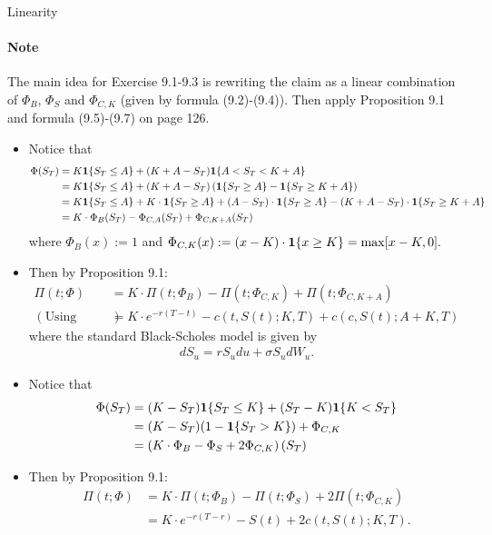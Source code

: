 \begin{prop}
	Linearity
\end{prop}
 \paragraph{Note} The main idea for Exercise 9.1-9.3 is rewriting the claim as a linear combination of $\Phi_B$, $\Phi_S$ and $\Phi_{C,K}$ (given by formula (9.2)-(9.4)). Then apply Proposition 9.1 and formula (9.5)-(9.7) on page 126. 
\begin{example}

	\begin{itemize}
		\item Notice that 
		\begin{align*}
		\Phi( S_T ) &= K \boldsymbol{1} \{  S_T \leq A \} + (K+A- S_T)\boldsymbol{1}\{ A < S_T<K+A \}     \\
		&=  K \boldsymbol{1} \{  S_T \leq A \} + (K+A -S_T) \left( \boldsymbol{1}\{ S_T \geq A \} -  \boldsymbol{1}\{ S_T \geq K+A  \}  \right) \\
		&= K \boldsymbol{1} \{  S_T \leq A \} + K\cdot \boldsymbol{1}\{ S_T \geq A \} + (A- S_T) \cdot \boldsymbol{1}\{ S_T \geq A \} - (K+A -S_T) \cdot\boldsymbol{1}\{ S_T \geq K+A  \}\\
		&= K \cdot \Phi_B(S_T) - \Phi_{C,A}(S_T) + \Phi_{C,K+A}(S_T)
		\end{align*} 
		where $\Phi_B(x) := 1$ and $\Phi_{C,K}(x):= (x - K) \cdot \boldsymbol{1}\{ x \geq K \} = \max[ x-K,0 ].$
		\item Then by Proposition 9.1:
		\begin{align*}
		\Pi(t; \Phi) &= K\cdot \Pi(t; \Phi_B ) - \Pi(t; \Phi_{C,K}) + \Pi(t; \Phi_{C,K+A}) \\
		(\text{Using formula (9.5)-(9.7)})&= K \cdot e^{-r(T-t)} - c\left( t, S(t); K,T  \right) + c\left(  c, S(t); A+K, T \right)
		\end{align*}
		where the standard Black-Scholes model is given by
		\begin{align*}
		d S_u = r S_u d u + \sigma S_u d W_u.
		\end{align*}
	\end{itemize}
\end{example}
\begin{example}
\begin{itemize}
	\item Notice that 
	\begin{align*}
	\Phi(S_T) &= (K- S_T) \boldsymbol{1}\{ S_T \leq K \} + (S_T - K) \boldsymbol{1}\{ K < S_T \} \\
	&= (K- S_T)(1 - \boldsymbol{1}\{ S_T > K \}) + \Phi_{C,K} \\
	&= \left(K\cdot \Phi_B - \Phi_S + 2 \Phi_{C,K}\right)(S_T)
	\end{align*}
	
	\item Then by Proposition 9.1:
	\begin{align*}
	\Pi(t; \Phi) &= K \cdot \Pi(t; \Phi_B) - \Pi(t; \Phi_S) +2 \Pi(t;  \Phi_{C,K}) \\
	&= K \cdot e^{-r(T-r)} - S(t) + 2c(t, S(t); K, T).
	\end{align*}
\end{itemize}
\end{example}
